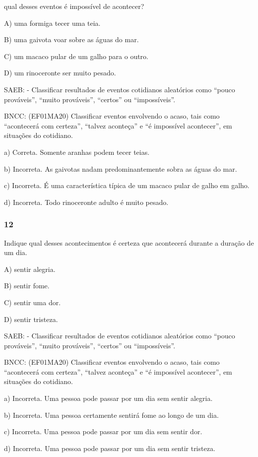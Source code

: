 qual desses eventos é impossível de acontecer?

A) uma formiga tecer uma teia.

B) uma gaivota voar sobre as águas do mar.

C) um macaco pular de um galho para o outro.

D) um rinoceronte ser muito pesado.

SAEB: - Classificar resultados de eventos cotidianos aleatórios como
``pouco prováveis'', ``muito prováveis'', ``certos'' ou ``impossíveis''.

BNCC: (EF01MA20) Classificar eventos envolvendo o acaso, tais como
``acontecerá com certeza'', ``talvez aconteça'' e ``é impossível
acontecer'', em situações do cotidiano.

a) Correta. Somente aranhas podem tecer teias.

b) Incorreta. As gaivotas nadam predominantemente sobra as águas do mar.

c) Incorreta. É uma característica típica de um macaco pular de galho em
galho.

d) Incorreta. Todo rinoceronte adulto é muito pesado.

\subsubsection{12}\label{section-98}

Indique qual desses acontecimentos é certeza que acontecerá durante a
duração de um dia.

A) sentir alegria.

B) sentir fome.

C) sentir uma dor.

D) sentir tristeza.

SAEB: - Classificar resultados de eventos cotidianos aleatórios como
``pouco prováveis'', ``muito prováveis'', ``certos'' ou ``impossíveis''.

BNCC: (EF01MA20) Classificar eventos envolvendo o acaso, tais como
``acontecerá com certeza'', ``talvez aconteça'' e ``é impossível
acontecer'', em situações do cotidiano.

a) Incorreta. Uma pessoa pode passar por um dia sem sentir alegria.

b) Incorreta. Uma pessoa certamente sentirá fome ao longo de um dia.

c) Incorreta. Uma pessoa pode passar por um dia sem sentir dor.

d) Incorreta. Uma pessoa pode passar por um dia sem sentir tristeza.

